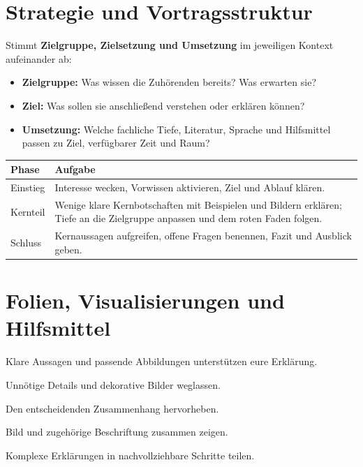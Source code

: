 \documentclass[11pt,a4paper,parskip=half]{scrartcl}
\begin{document}
\handouttitel

\section{Strategie und Vortragsstruktur}
Stimmt \textbf{Zielgruppe, Zielsetzung und Umsetzung} im jeweiligen Kontext aufeinander ab:
\begin{itemize}
  \item \textbf{Zielgruppe:} Was wissen die Zuhörenden bereits? Was erwarten sie?
  \item \textbf{Ziel:} Was sollen sie anschließend verstehen oder erklären können?
  \item \textbf{Umsetzung:} Welche fachliche Tiefe, Literatur, Sprache und
        Hilfsmittel passen zu Ziel, verfügbarer Zeit und Raum?
\end{itemize}

\begin{tabularx}{\linewidth}{@{}P{.16\linewidth}Y@{}}
  \toprule
  \textbf{Phase} & \textbf{Aufgabe} \\
  \midrule
  Einstieg & Interesse wecken, Vorwissen aktivieren, Ziel und Ablauf klären. \\
  Kernteil & Wenige klare Kernbotschaften mit Beispielen und Bildern erklären;
             Tiefe an die Zielgruppe anpassen und dem roten Faden folgen. \\
  Schluss & Kernaussagen aufgreifen, offene Fragen benennen, Fazit und Ausblick geben. \\
  \bottomrule
\end{tabularx}

\section{Folien, Visualisierungen und Hilfsmittel}
\begin{merksatz}[Gestaltungsziel]
Klare Aussagen und passende Abbildungen unterstützen eure Erklärung.
\end{merksatz}

\begin{description}[font=\normalfont\bfseries,leftmargin=0pt]
  \item[Kohärenz:] Unnötige Details und dekorative Bilder weglassen.
  \item[Signalisierung:] Den entscheidenden Zusammenhang hervorheben.
  \item[Räumliche Nähe:] Bild und zugehörige Beschriftung zusammen zeigen.
  \item[Dosierung:] Komplexe Erklärungen in nachvollziehbare Schritte teilen.
\end{description}
\end{document}
